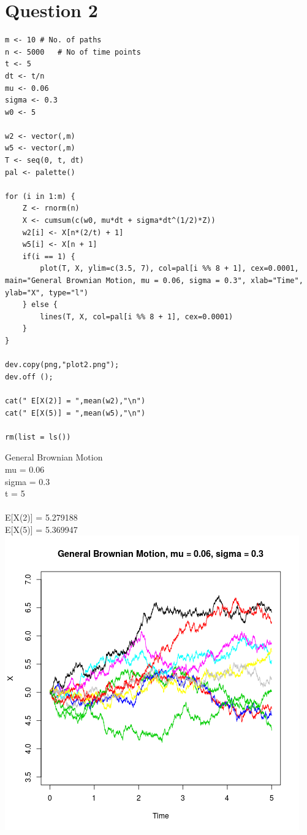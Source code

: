 \documentclass{article}
\begin{document}
\section{Question 2}


\begin{lstlisting}
m <- 10	# No. of paths
n <- 5000	# No of time points
t <- 5
dt <- t/n
mu <- 0.06
sigma <- 0.3
w0 <- 5

w2 <- vector(,m)
w5 <- vector(,m)
T <- seq(0, t, dt)
pal <- palette()

for (i in 1:m) {
	Z <- rnorm(n)
	X <- cumsum(c(w0, mu*dt + sigma*dt^(1/2)*Z))
	w2[i] <- X[n*(2/t) + 1]
	w5[i] <- X[n + 1]
	if(i == 1) {
		plot(T, X, ylim=c(3.5, 7), col=pal[i %% 8 + 1], cex=0.0001, main="General Brownian Motion, mu = 0.06, sigma = 0.3", xlab="Time", ylab="X", type="l")
	} else {
		lines(T, X, col=pal[i %% 8 + 1], cex=0.0001)
	}
}

dev.copy(png,"plot2.png");
dev.off ();

cat(" E[X(2)] = ",mean(w2),"\n")
cat(" E[X(5)] = ",mean(w5),"\n")

rm(list = ls())
\end{lstlisting}

General Brownian Motion \\
mu = 0.06\\
sigma = 0.3\\
t = 5\\\\
 E[X(2)] =  5.279188 \\
 E[X(5)] =  5.369947 \\
\includegraphics{"plot2"}
\pagebreak
\end{document}
